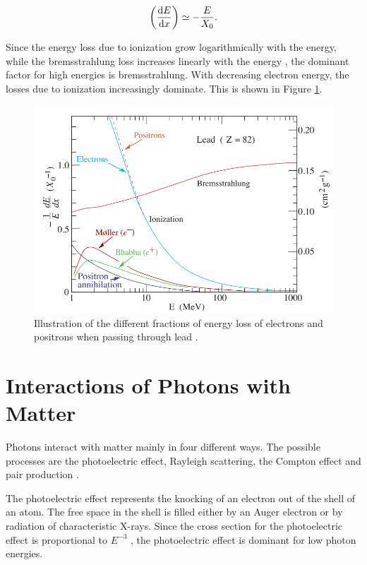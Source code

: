\documentclass[12pt, a4paper]{thesis}
\begin{document}
\begin{align}
  \left( \dv{E}{x} \right) \simeq - \frac{E}{X_0}.
\end{align}

Since the energy loss due to ionization grow logarithmically with
the energy, while the bremsstrahlung loss increases linearly with the
energy \cite{PhysRevD.98.030001}, the dominant factor for high
energies is bremsstrahlung. With decreasing electron energy, the
losses due to ionization increasingly dominate. This is shown in
Figure \ref{bremsstrahlung}.

\begin{figure}[hbtp]
  \centering
  \includegraphics[width=0.8 \textwidth]{../images/bremsstrahlung.png}
  \caption{ Illustration of the different fractions of energy loss of
    electrons and positrons when passing through lead
    \cite{PhysRevD.98.030001}.}
  \label{bremsstrahlung}
\end{figure}


\clearpage
\section{Interactions of Photons with Matter}

Photons interact with matter mainly in four different ways. The
possible processes are the photoelectric effect, Rayleigh scattering,
the Compton effect and pair production \cite{wigman18}.

The photoelectric effect represents the knocking of an electron out of
the shell of an atom. The free space in the shell is filled either by
an Auger electron or by radiation of characteristic X-rays. Since the
cross section for the photoelectric effect is proportional to $E^{-3}$
\cite{wigman18}, the photoelectric effect is dominant for low photon
energies.
\end{document}
